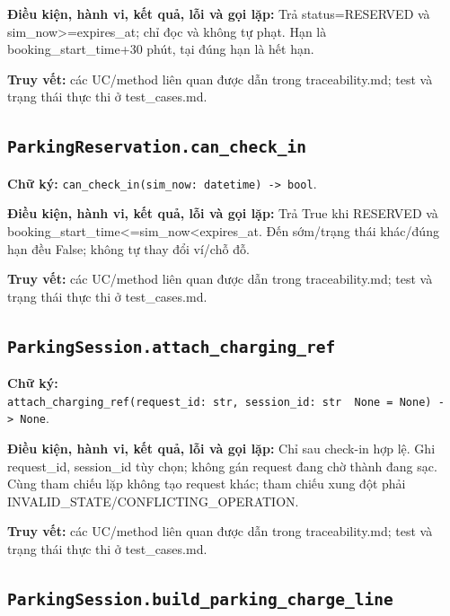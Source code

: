 \documentclass[11pt,a4paper]{article}
\begin{document}
\textbf{Điều kiện, hành vi, kết quả, lỗi và gọi lặp:} Trả
status=RESERVED và sim\_now\textgreater=expires\_at; chỉ đọc và không tự
phạt. Hạn là booking\_start\_time+30 phút, tại đúng hạn là hết hạn.

\textbf{Truy vết:} các UC/method liên quan được dẫn trong
traceability.md; test và trạng thái thực thi ở test\_cases.md.

\hypertarget{parkingreservation.can_check_in}{%
\subsection{\texorpdfstring{\texttt{ParkingReservation.can\_check\_in}}{ParkingReservation.can\_check\_in}}\label{parkingreservation.can_check_in}}

\textbf{Chữ ký:}
\texttt{can\_check\_in(sim\_now:\ datetime)\ -\textgreater{}\ bool}.

\textbf{Điều kiện, hành vi, kết quả, lỗi và gọi lặp:} Trả True khi
RESERVED và booking\_start\_time\textless=sim\_now\textless expires\_at.
Đến sớm/trạng thái khác/đúng hạn đều False; không tự thay đổi ví/chỗ đỗ.

\textbf{Truy vết:} các UC/method liên quan được dẫn trong
traceability.md; test và trạng thái thực thi ở test\_cases.md.

\hypertarget{parkingsession.attach_charging_ref}{%
\subsection{\texorpdfstring{\texttt{ParkingSession.attach\_charging\_ref}}{ParkingSession.attach\_charging\_ref}}\label{parkingsession.attach_charging_ref}}

\textbf{Chữ ký:}
\texttt{attach\_charging\_ref(request\_id:\ str,\ session\_id:\ str\ \textbar{}\ None\ =\ None)\ -\textgreater{}\ None}.

\textbf{Điều kiện, hành vi, kết quả, lỗi và gọi lặp:} Chỉ sau check-in
hợp lệ. Ghi request\_id, session\_id tùy chọn; không gán request đang
chờ thành đang sạc. Cùng tham chiếu lặp không tạo request khác; tham
chiếu xung đột phải INVALID\_STATE/CONFLICTING\_OPERATION.

\textbf{Truy vết:} các UC/method liên quan được dẫn trong
traceability.md; test và trạng thái thực thi ở test\_cases.md.

\hypertarget{parkingsession.build_parking_charge_line}{%
\subsection{\texorpdfstring{\texttt{ParkingSession.build\_parking\_charge\_line}}{ParkingSession.build\_parking\_charge\_line}}\label{parkingsession.build_parking_charge_line}}
\end{document}
